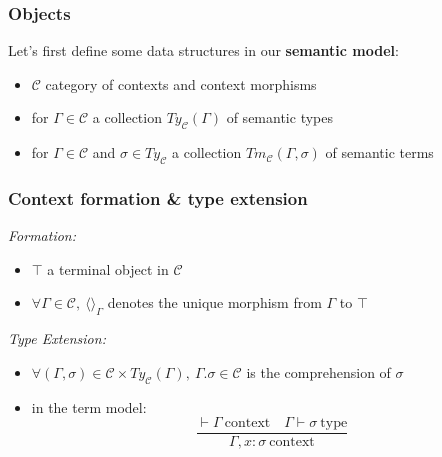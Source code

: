 \documentclass[aspectratio=169]{beamer}
\newcommand{\cntxt}{\ \mathrm{context}}
\newcommand{\typ}{\ \mathrm{type}}
\newcommand{\Gamdash}{\Gamma\vdash}
\newcommand{\cate}{\mathcal{C}}
\newcommand{\types}{Ty_{\cate}}
\newcommand{\terms}{Tm_{\cate}}
\newcommand{\extension}{\Gamma.\sigma}
\begin{document}
    \begin{frame}
        \frametitle{Objects}
        Let's first define some data structures in our \textbf{semantic model}:
        \vspace{8pt}
        \begin{itemize}
            \item $\cate$ category of contexts and context morphisms
            \vspace{8pt}
            \item for $\Gamma\in\cate$ a collection $\types(\Gamma)$ of semantic types
            \vspace{8pt}
            \item for $\Gamma\in\cate$ and $\sigma\in\types$ a collection $\terms(\Gamma,\sigma)$ of semantic terms
        \end{itemize}
    \end{frame}
    
    \begin{frame}
        \frametitle{Context formation \& type extension}
        \emph{Formation:}
        \begin{itemize}
            \item $\top$ a terminal object in $\cate$
            \item $\forall \Gamma \in \cate,\ \langle\rangle_\Gamma$ denotes the unique morphism from $\Gamma$ to $\top$ 
        \end{itemize}
        \vspace{15pt}
        \emph{Type Extension:}
        \begin{itemize}
            \item $\forall (\Gamma,\sigma) \in \cate \times \types(\Gamma),\ \extension\in\cate$ is the comprehension of $\sigma$
            \item in the term model:
            $$\frac{\vdash\Gamma \cntxt\quad\Gamdash\sigma\typ}{\Gamma,x:\sigma\cntxt}$$
        \end{itemize}
    \end{frame}
\end{document}
